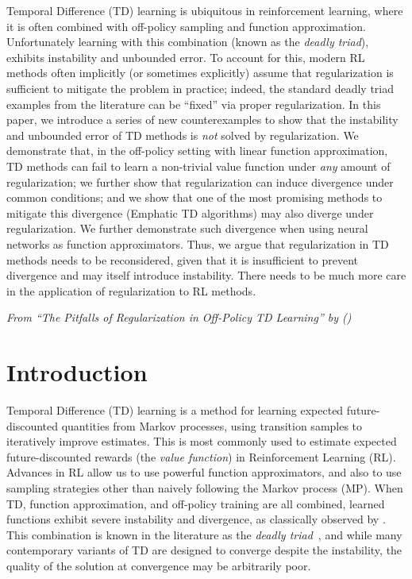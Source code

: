 Temporal Difference (TD) learning is ubiquitous in reinforcement learning, where it is often combined with off-policy sampling and function approximation.  Unfortunately learning with this combination (known as the \emph{deadly triad}), exhibits instability and unbounded error.  To account for this, modern RL methods often implicitly (or sometimes explicitly) assume that regularization is sufficient to mitigate the problem in practice; indeed, the standard deadly triad examples from the literature can be ``fixed'' via proper regularization. In this paper, we introduce a series of new counterexamples to show that the instability and unbounded error of TD methods is \emph{not} solved by regularization. We demonstrate that, in the off-policy setting with linear function approximation, TD methods can fail to learn a non-trivial value function under \emph{any} amount of regularization; we further show that regularization can induce divergence under common conditions; and we show that one of the most promising methods to mitigate this divergence (Emphatic TD algorithms) may also diverge under regularization. We further demonstrate such divergence when using neural networks as function approximators.  Thus, we argue that regularization in TD methods needs to be reconsidered, given that it is insufficient to prevent divergence and may itself introduce instability. There needs to be much more care in the application of regularization to RL methods.

\emph{From ``The Pitfalls of Regularization in Off-Policy TD Learning'' by \citeauthor{manek2022pitfalls} (\citeyear{manek2022pitfalls})}

\clearpage

\section{Introduction}
Temporal Difference (TD) learning is a method for learning expected future-discounted quantities from Markov processes, using transition samples to iteratively improve estimates. This is most commonly used to estimate expected future-discounted rewards (the \emph{value function}) in Reinforcement Learning (RL). Advances in RL allow us to use powerful function approximators, and also to use sampling strategies other than naively following the Markov process (MP). When TD, function approximation, and off-policy training are all combined, learned functions exhibit severe instability and divergence, as classically observed by \citet{baird1993counterexample,tsitsiklis1996analysis}. This combination is known in the literature as the \emph{deadly triad}~\cite[pg.~264]{sutton2020reinforcement}, and while many contemporary variants of TD are designed to converge despite the instability, the quality of the solution at convergence may be arbitrarily poor.

